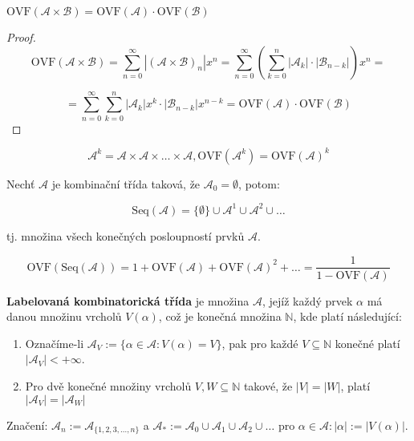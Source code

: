 \begin{pozor}
	$\text{OVF}(\mathcal{A} \times \mathcal{B}) = \text{OVF}(\mathcal{A}) \cdot \text{OVF}(\mathcal{B})$
\end{pozor}

\begin{proof}
	$$
	\text{OVF}(\mathcal{A} \times \mathcal{B}) = \sum_{n=0}^{\infty} |(\mathcal{A} \times \mathcal{B})_{n}|x^{n} = \sum_{n=0}^{\infty}\left(\sum_{k=0}^{n}|\mathcal{A}_{k}| \cdot |\mathcal{B}_{n-k}|\right)x^{n} =
	$$
	
	$$
	= \sum_{n=0}^{\infty} \sum_{k=0}^{n} |\mathcal{A}_{k}|x^{k} \cdot |\mathcal{B}_{n-k}|x^{n-k} = \text{OVF}(\mathcal{A}) \cdot \text{OVF}(\mathcal{B})
	$$
\end{proof}

\begin{pozor}
	$$
	\mathcal{A}^{k} = \mathcal{A} \times \mathcal{A} \times \dots \times \mathcal{A}, \text{OVF}(\mathcal{A}^{k}) = \text{OVF}(\mathcal{A})^{k}
	$$
\end{pozor}

\begin{definice}
	Nechť $\mathcal{A}$ je kombinační třída taková, že $\mathcal{A}_{0} = \emptyset$, potom:
	
	$$
	\text{Seq}(\mathcal{A}) = \{\emptyset\} \cup \mathcal{A}^{1} \cup \mathcal{A}^{2} \cup \dots
	$$
	
	tj. množina všech konečných posloupností prvků $\mathcal{A}$.
\end{definice}

\begin{pozor}
	$$
	\text{OVF}(\text{Seq}(\mathcal{A})) = 1 + \text{OVF}(\mathcal{A}) + \text{OVF}(\mathcal{A})^{2} + \dots = \frac{1}{1 - \text{OVF}(\mathcal{A})}
	$$
\end{pozor}

\begin{definice}
	\textbf{Labelovaná kombinatorická třída} je množina $\mathcal{A}$, jejíž každý prvek $\alpha$ má danou množinu vrcholů $V(\alpha)$, což je konečná množina $\mathbb{N}$, kde platí následující:
	
	\begin{enumerate}
		\item Označíme-li $\mathcal{A}_{V} := \{\alpha \in \mathcal{A}: V(\alpha) = V\}$, pak pro každé $V \subseteq \mathbb{N}$ konečné platí $|\mathcal{A}_{V}| < + \infty$.
		\item Pro dvě konečné množiny vrcholů $V,W \subseteq \mathbb{N}$ takové, že $|V| = |W|$, platí $|\mathcal{A}_{V}| = |\mathcal{A}_{W}|$
	\end{enumerate}
	
	Značení: $\mathcal{A}_{n} := \mathcal{A}_{\{1,2,3, \dots , n\}}$ a $\mathcal{A}_{\ast} := \mathcal{A}_{0} \cup \mathcal{A}_{1} \cup \mathcal{A}_{2} \cup \dots$ pro $\alpha \in \mathcal{A}:|\alpha| := |V(\alpha)|$.
\end{definice}

